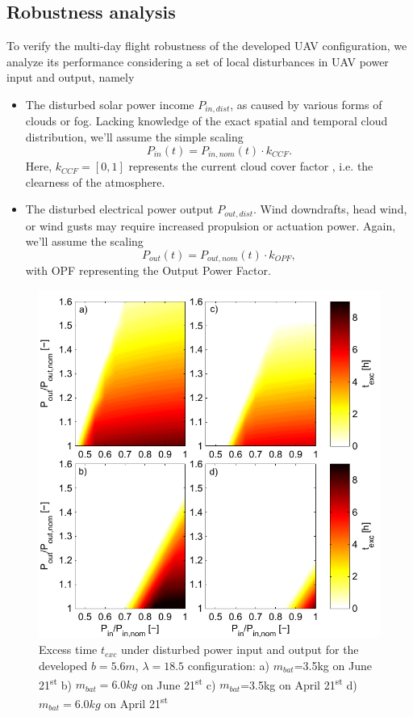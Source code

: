  \subsection{Robustness analysis}
To verify the multi-day flight robustness of the developed UAV configuration, we analyze its performance considering a set of local disturbances in UAV power input and output, namely
\begin{itemize}
\item The disturbed solar power income $P_{in,dist}$, as caused by various forms of clouds or fog. Lacking knowledge of the exact spatial and temporal cloud distribution, we'll assume the simple scaling $$ P_{in}(t) = P_{in,nom}(t) \cdot k_{CCF}. $$ Here, $k_{CCF}=[0,1]$  represents the current cloud cover factor \cite{Kimura_SolarRadAndClouds}, i.e. the clearness of the atmosphere.
\item The disturbed electrical power output $P_{out,dist}$. Wind downdrafts, head wind, or wind gusts may require increased propulsion or actuation power. Again, we'll assume the scaling  $$ P_{out}(t) = P_{out,nom}(t) \cdot k_{OPF}, $$ with OPF representing the Output Power Factor.
\end{itemize}
\begin{figure}
    \centering
    \includegraphics[width=\linewidth]{images/5_texcRobustness}
    \caption{Excess time $t_{exc}$ under disturbed power input and output for the developed $b=5.6m$, $\lambda=18.5$ configuration: a) $m_{bat}$=3.5kg on June 21\textsuperscript{st} b) $m_{bat}=6.0kg$ on June 21\textsuperscript{st} c) $m_{bat}$=3.5kg on April 21\textsuperscript{st} d) $m_{bat}=6.0kg$ on April 21\textsuperscript{st} }
    \label{fig:ExcessTimeRobustness}
\end{figure}
